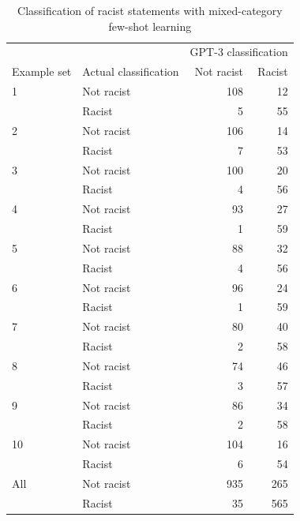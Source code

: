 \documentclass[12pt,]{article}
\begin{document}
\begin{table}[!h]

\caption{\label{tab:fewshotmixed-racism}Classification of racist statements with mixed-category few-shot learning}
\centering
\fontsize{8}{10}\selectfont
\begin{tabular}[t]{llrr}
\toprule
\multicolumn{2}{c}{ } & \multicolumn{2}{c}{GPT-3 classification} \\
\cmidrule(l{3pt}r{3pt}){3-4}
Example set & Actual classification & Not racist & Racist\\
\midrule
1 & Not racist & 108 & 12\\
 & Racist & 5 & 55\\
\midrule
2 & Not racist & 106 & 14\\
 & Racist & 7 & 53\\
\midrule
3 & Not racist & 100 & 20\\
 & Racist & 4 & \vphantom{1} 56\\
\midrule
4 & Not racist & 93 & 27\\
 & Racist & 1 & \vphantom{1} 59\\
\midrule
5 & Not racist & 88 & 32\\
 & Racist & 4 & 56\\
\midrule
6 & Not racist & 96 & 24\\
 & Racist & 1 & 59\\
\midrule
7 & Not racist & 80 & 40\\
 & Racist & 2 & \vphantom{1} 58\\
\midrule
8 & Not racist & 74 & 46\\
 & Racist & 3 & 57\\
\midrule
9 & Not racist & 86 & 34\\
 & Racist & 2 & 58\\
\midrule
10 & Not racist & 104 & 16\\
 & Racist & 6 & 54\\
\midrule
All & Not racist & 935 & 265\\
 & Racist & 35 & 565\\
\bottomrule
\end{tabular}
\end{table}
\end{document}
